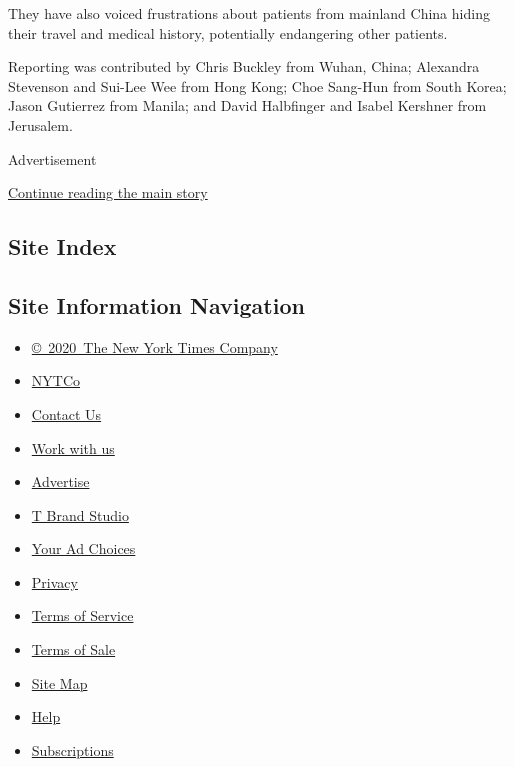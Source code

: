 They have also voiced frustrations about patients from mainland China
hiding their travel and medical history, potentially endangering other
patients.

Reporting was contributed by Chris Buckley from Wuhan, China; Alexandra
Stevenson and Sui-Lee Wee from Hong Kong; Choe Sang-Hun from South
Korea; Jason Gutierrez from Manila; and David Halbfinger and Isabel
Kershner from Jerusalem.

Advertisement

\protect\hyperlink{after-bottom}{Continue reading the main story}

\hypertarget{site-index}{%
\subsection{Site Index}\label{site-index}}

\hypertarget{site-information-navigation}{%
\subsection{Site Information
Navigation}\label{site-information-navigation}}

\begin{itemize}
\tightlist
\item
  \href{https://help.nytimes3xbfgragh.onion/hc/en-us/articles/115014792127-Copyright-notice}{©~2020~The
  New York Times Company}
\end{itemize}

\begin{itemize}
\tightlist
\item
  \href{https://www.nytco.com/}{NYTCo}
\item
  \href{https://help.nytimes3xbfgragh.onion/hc/en-us/articles/115015385887-Contact-Us}{Contact
  Us}
\item
  \href{https://www.nytco.com/careers/}{Work with us}
\item
  \href{https://nytmediakit.com/}{Advertise}
\item
  \href{http://www.tbrandstudio.com/}{T Brand Studio}
\item
  \href{https://www.nytimes3xbfgragh.onion/privacy/cookie-policy\#how-do-i-manage-trackers}{Your
  Ad Choices}
\item
  \href{https://www.nytimes3xbfgragh.onion/privacy}{Privacy}
\item
  \href{https://help.nytimes3xbfgragh.onion/hc/en-us/articles/115014893428-Terms-of-service}{Terms
  of Service}
\item
  \href{https://help.nytimes3xbfgragh.onion/hc/en-us/articles/115014893968-Terms-of-sale}{Terms
  of Sale}
\item
  \href{https://spiderbites.nytimes3xbfgragh.onion}{Site Map}
\item
  \href{https://help.nytimes3xbfgragh.onion/hc/en-us}{Help}
\item
  \href{https://www.nytimes3xbfgragh.onion/subscription?campaignId=37WXW}{Subscriptions}
\end{itemize}
